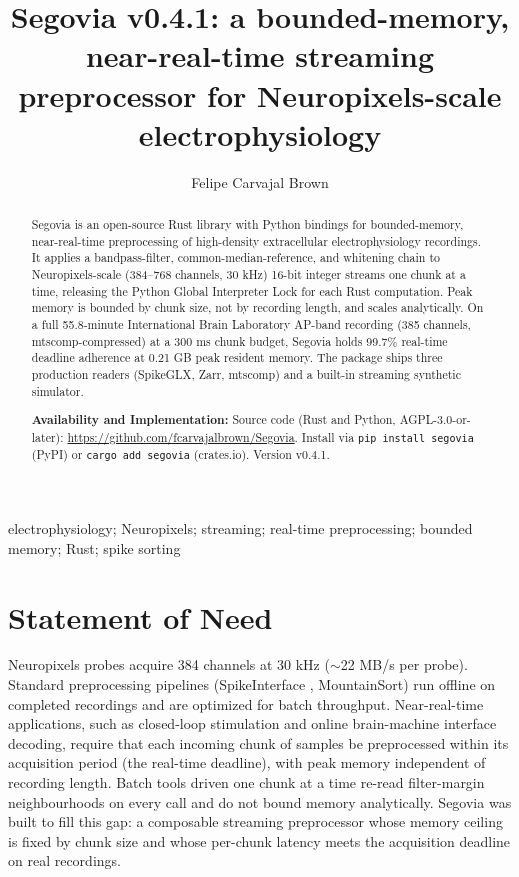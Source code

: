\documentclass[a4paper,num-refs,gigabyte]{oup-contemporary}
\title{Segovia v0.4.1: a bounded-memory, near-real-time streaming preprocessor for Neuropixels-scale electrophysiology}
\author[1,\authfn{1}]{Felipe Carvajal Brown}
\affil[1]{Independent Researcher}
\begin{document}
\begin{frontmatter}
\maketitle
\begin{abstract}
Segovia is an open-source Rust library with Python bindings for bounded-memory, near-real-time preprocessing of high-density extracellular electrophysiology recordings. It applies a bandpass-filter, common-median-reference, and whitening chain to Neuropixels-scale (384--768 channels, 30 kHz) 16-bit integer streams one chunk at a time, releasing the Python Global Interpreter Lock for each Rust computation. Peak memory is bounded by chunk size, not by recording length, and scales analytically. On a full 55.8-minute International Brain Laboratory AP-band recording (385 channels, mtscomp-compressed) at a 300 ms chunk budget, Segovia holds 99.7\% real-time deadline adherence at 0.21 GB peak resident memory. The package ships three production readers (SpikeGLX, Zarr, mtscomp) and a built-in streaming synthetic simulator.

\textbf{Availability and Implementation:} Source code (Rust and Python, AGPL-3.0-or-later): \url{https://github.com/fcarvajalbrown/Segovia}. Install via \texttt{pip install segovia} (PyPI) or \texttt{cargo add segovia} (crates.io). Version v0.4.1.
\end{abstract}

\begin{keywords}
electrophysiology; Neuropixels; streaming; real-time preprocessing; bounded memory; Rust; spike sorting
\end{keywords}
\end{frontmatter}

\section{Statement of Need}
\label{sec:background}

Neuropixels probes \citep{Jun2017} acquire 384 channels at 30 kHz ($\sim$22 MB/s per probe). Standard preprocessing pipelines (SpikeInterface \citep{Buccino2020}, MountainSort) run offline on completed recordings and are optimized for batch throughput. Near-real-time applications, such as closed-loop stimulation and online brain-machine interface decoding, require that each incoming chunk of samples be preprocessed within its acquisition period (the real-time deadline), with peak memory independent of recording length. Batch tools driven one chunk at a time re-read filter-margin neighbourhoods on every call and do not bound memory analytically. Segovia was built to fill this gap: a composable streaming preprocessor whose memory ceiling is fixed by chunk size and whose per-chunk latency meets the acquisition deadline on real recordings.
\end{document}
